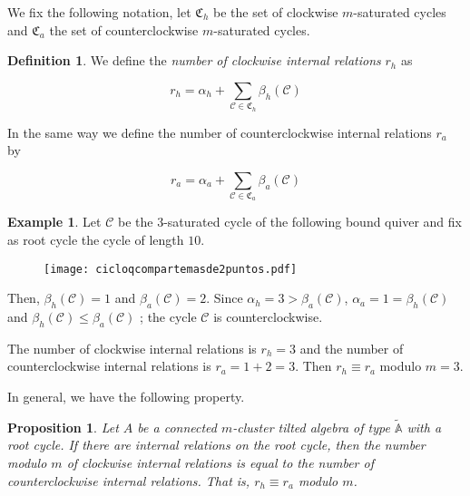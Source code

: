 \documentclass{amsart}
\theoremstyle{plain}
\newtheorem{prop}[teo]{Proposition}
\theoremstyle{definition}
\newtheorem{defi}[teo]{Definition}
\newtheorem{ejem}[teo]{Example}
\begin{document}
We fix the following  notation, let $\mathfrak{C}_h$ be the set of clockwise   $m$-saturated cycles and $\mathfrak{C}_a$ the set of counterclockwise  $m$-saturated cycles.\\

\begin{defi}
We define the \textit{number of clockwise internal relations} $r_h$ as

$$r_h=\alpha_{h}+\sum _{\mathcal{C}\in \mathfrak{C}_h}  \beta_h(\mathcal{C}) $$

 In the same way we define the number of counterclockwise internal relations  $r_a$ by

$$r_a=\alpha_{a}+\sum _{\mathcal{C}\in \mathfrak{C}_a}  \beta_a(\mathcal{C})$$

\end{defi}

\begin{ejem}
Let $\mathcal{C}$ be the $3$-saturated cycle of the following bound quiver and fix as  root cycle the cycle of length $10$.

\begin{figure}[H]
\begin{center}
\hspace{1cm}\texttt{[image: cicloqcompartemasde2puntos.pdf]}
\end{center}
\end{figure}

Then, $\beta_h(\mathcal{C})=1$ and $\beta_a(\mathcal{C})=2$. Since $\alpha_h=3>\beta_a(\mathcal{C})$, $\alpha_a=1=\beta_h(\mathcal{C})$ and $\beta_h(\mathcal{C})\leq \beta_a(\mathcal{C})$ ; the cycle $\mathcal{C}$ is counterclockwise.\

The number of clockwise internal relations is  $r_h= 3$ and the number of counterclockwise internal relations  is $r_a= 1+2=3$. Then $r_h\equiv r_a$ modulo $m=3$.

\end{ejem}

In general, we have the following property.\\

\begin{prop}\label{internal relations} Let $A$ be a connected  $m$-cluster tilted algebra of  type $\tilde{\mathbb{A}}$ with a root cycle. If there are internal relations on the root cycle, then the  number modulo $m$ of clockwise internal relations is equal to the number of counterclockwise internal  relations. That is,  $r_h\equiv r_a$ modulo $m$.

\end{prop}
\end{document}
